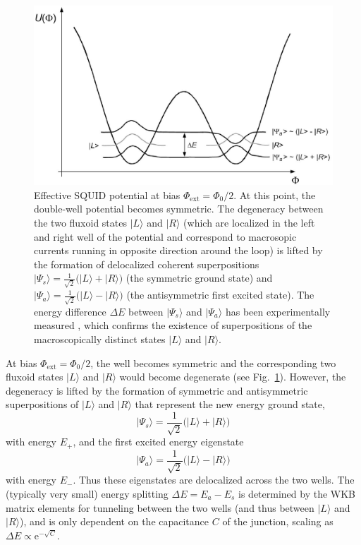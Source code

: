 \documentclass[12pt,aps,floatfix,amsmath,amssymb,showpacs,nofootinbib]{revtex4-2}
\newcommand{\be}{\begin{equation}} \newcommand{\ee}{\end{equation}}
\newcommand{\ket}[1]{\ensuremath{|{#1\rangle}}}
\newcommand{\e}{\ensuremath{\mathrm{e}}}
\begin{document}
\begin{figure}
\begin{center}
\includegraphics[scale=0.4]{squid-pot-n.eps}
\end{center}
\caption[Effective SQUID potential at bias $\Phi_\text{ext} = \Phi_0/2$]{\label{fig:squid-pot}
  Effective SQUID potential at bias $\Phi_\text{ext} = \Phi_0/2$. At
  this point, the double-well potential becomes symmetric. The
  degeneracy between the two fluxoid states $\ket{L}$ and $\ket{R}$
  (which are localized in the left and right well of the potential and
  correspond to macrosopic currents running in opposite direction
  around the loop) is lifted by the formation of delocalized coherent
  superpositions $\ket{\Psi_s} = \frac{1}{\sqrt{2}} \bigl( \ket{L} +
  \ket{R} \bigr)$ (the symmetric ground state) and $\ket{\Psi_a} =
  \frac{1}{\sqrt{2}} \bigl( \ket{L} - \ket{R} \bigr)$ (the
  antisymmetric first excited state).  The energy difference $\Delta
  E$ between $\ket{\Psi_s}$ and $\ket{\Psi_a}$ has been experimentally
  measured \cite{Friedman:2000:rr,Wal:2000:om}, which confirms the
  existence of superpositions of the macroscopically distinct states
  $\ket{L}$ and $\ket{R}$.}
\end{figure}


At bias $\Phi_\text{ext} = \Phi_0/2$, the well becomes symmetric and
the corresponding two fluxoid states $\ket{L}$ and $\ket{R}$ would
become degenerate (see Fig.~\ref{fig:squid-pot}).  However, the
degeneracy is lifted by the formation of symmetric and antisymmetric
superpositions of $\ket{L}$ and $\ket{R}$ that represent the new
energy ground state,
%
\be
\ket{\Psi_s} = \frac{1}{\sqrt{2}} \bigl( \ket{L} + \ket{R} \bigr)
\ee
%
with energy $E_+$, and the first excited energy eigenstate
%
\be
\ket{\Psi_a} = \frac{1}{\sqrt{2}} \bigl( \ket{L} - \ket{R} \bigr)
\ee
%
with energy $E_-$.  Thus these eigenstates are delocalized across the
two wells. The (typically very small) energy splitting $\Delta E = E_a
- E_s$ is determined by the WKB matrix elements for tunneling between
the two wells (and thus between $\ket{L}$ and $\ket{R}$), and is only
dependent on the capacitance $C$ of the junction, scaling as $\Delta E
\propto \e^{-\sqrt{C}}$.    
\end{document}
